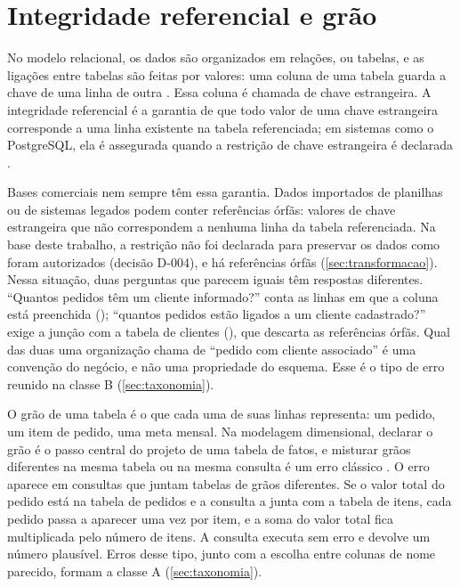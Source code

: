 \section{Integridade referencial e grão}
\label{sec:integridade-grao}

No modelo relacional, os dados são organizados em relações, ou tabelas,
e as ligações entre tabelas são feitas por valores: uma coluna de uma
tabela guarda a chave de uma linha de outra \cite{codd1970relational}. Essa
coluna é chamada de chave estrangeira. A integridade referencial é a
garantia de que todo valor de uma chave estrangeira corresponde a uma
linha existente na tabela referenciada; em sistemas como o PostgreSQL, ela
é assegurada quando a restrição de chave estrangeira é declarada
\cite{postgresql16}.

Bases comerciais nem sempre têm essa garantia. Dados importados de
planilhas ou de sistemas legados podem conter referências órfãs: valores
de chave estrangeira que não correspondem a nenhuma linha da tabela
referenciada. Na base deste trabalho, a restrição não foi declarada para
preservar os dados como foram autorizados (decisão D-004), e há
referências órfãs (\autoref{sec:transformacao}). Nessa situação, duas
perguntas que parecem iguais têm respostas diferentes. ``Quantos pedidos
têm um cliente informado?'' conta as linhas em que a coluna está
preenchida (); ``quantos pedidos estão
ligados a um cliente cadastrado?'' exige a junção com a tabela de
clientes (), que descarta as referências órfãs. Qual das duas
uma organização chama de ``pedido com cliente associado'' é uma convenção
do negócio, e não uma propriedade do esquema. Esse é o tipo de erro
reunido na classe B (\autoref{sec:taxonomia}).

O grão de uma tabela é o que cada uma de suas linhas representa: um
pedido, um item de pedido, uma meta mensal. Na modelagem dimensional,
declarar o grão é o passo central do projeto de uma tabela de fatos, e
misturar grãos diferentes na mesma tabela ou na mesma consulta é um erro
clássico \cite{kimball2013techniques}. O erro aparece em consultas que
juntam tabelas de grãos diferentes. Se o valor total do pedido está na
tabela de pedidos e a consulta a junta com a tabela de itens, cada pedido
passa a aparecer uma vez por item, e a soma do valor total fica
multiplicada pelo número de itens. A consulta executa sem erro e devolve
um número plausível. Erros desse tipo, junto com a escolha entre colunas
de nome parecido, formam a classe A (\autoref{sec:taxonomia}).

